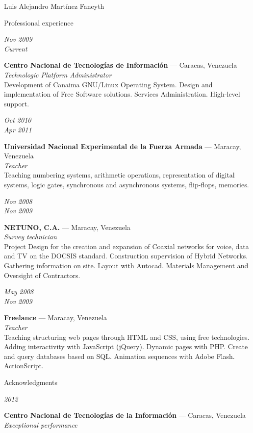 \documentclass[11pt,letterpaper]{article}
\begin{document}
\begin{cv}{Luis Alejandro Mart\'inez Faneyth}
\begin{cvlist}{Professional experience}
\item[{\parbox[t]{6em}{\textit{\large{Nov 2009\\Current}}}}]{
	\parbox[t]{\linewidth}{
		\textbf{Centro Nacional de Tecnolog\'ias de Informaci\'on} --- Caracas, Venezuela\\
		\textit{Technologic Platform Administrator}\\
		\footnotesize{Development of Canaima GNU/Linux Operating System. Design and implementation of Free Software solutions. Services Administration. High-level support.}
	}
}
\item[{\parbox[t]{6em}{\textit{\large{Oct 2010\\Apr 2011}}}}]{
	\parbox[t]{\linewidth}{
		\textbf{Universidad Nacional Experimental de la Fuerza Armada} --- Maracay, Venezuela\\
		\textit{Teacher}\\
		\footnotesize{Teaching numbering systems, arithmetic operations, representation of digital systems, logic gates, synchronous and asynchronous systems, flip-flops, memories.}
	}
}
\item[{\parbox[t]{6em}{\textit{\large{Nov 2008\\Nov 2009}}}}]{
	\parbox[t]{\linewidth}{
		\textbf{NETUNO, C.A.} --- Maracay, Venezuela\\
		\textit{Survey technician}\\
		\footnotesize{Project Design for the creation and expansion of Coaxial networks for voice, data and TV on the DOCSIS standard. Construction supervision of Hybrid Networks. Gathering information on site. Layout with Autocad. Materials Management and Oversight of Contractors.}
	}
}
\item[{\parbox[t]{6em}{\textit{\large{May 2008\\Nov 2009}}}}]{
	\parbox[t]{\linewidth}{
		\textbf{Freelance} --- Maracay, Venezuela\\
		\textit{Teacher}\\
		\footnotesize{Teaching structuring web pages through HTML and CSS, using free technologies. Adding interactivity with JavaScript (jQuery). Dynamic pages with PHP. Create and query databases based on SQL. Animation sequences with Adobe Flash. ActionScript.}
	}
}
\end{cvlist}

\begin{cvlist}{Acknowledgments}
\item[{\parbox[t]{6em}{\textit{\large{2012}}}}]{
	\parbox[t]{\linewidth}{
		\textbf{Centro Nacional de Tecnolog\'ias de la Informaci\'on} --- Caracas, Venezuela\\
		\textit{Exceptional performance}
	}
}
\end{cvlist}


\end{cv}
\end{document}
